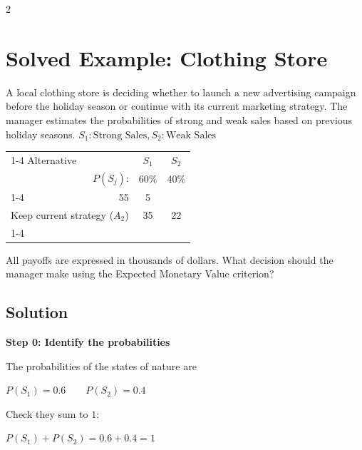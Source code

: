 \begin{multicols}{2}
	
	
	\newpage
	
	\section{Solved Example: Clothing Store}
		
		A local clothing store is deciding whether to launch a new advertising
		campaign before the holiday season or continue with its current
		marketing strategy. The manager estimates the probabilities of strong
		and weak sales based on previous holiday seasons.
		$
		S_1:\text{Strong Sales}
		,
		S_2:\text{Weak Sales}
		$
		\begin{center}
			\renewcommand{\arraystretch}{1.3}
			\small
			\begin{tabular}{lr@{\qquad}cc}
				\cmidrule{1-4}
				Alternative & & $S_1$ & $S_2$ \\
				& $P(S_j)$: & 60\% & 40\% \\
				\cmidrule{1-4}
				\multicolumn{2}{l}{Launch new campaign ($A_1$)} & 55 & 5 \\
				\multicolumn{2}{l}{Keep current strategy ($A_2$)} & 35 & 22 \\
				\cmidrule{1-4}
			\end{tabular}
		\end{center}
		
		All payoffs are expressed in thousands of dollars. What decision should
		the manager make using the Expected Monetary Value criterion?\vspace{-4mm}
		
		\subsection{Solution}
		
		\textbf{Step 0: Identify the probabilities}
		\begin{center}
			\begin{minipage}[c]{0.2\textwidth}
				The probabilities of the states of nature are
			\end{minipage}
			\hfill
			\begin{minipage}[c]{0.28\textwidth}
				\centering
				$P(S_1)=0.6
				\qquad
				P(S_2)=0.4$
			\end{minipage}
		\end{center}
		\begin{center}
			\begin{minipage}[c]{0.2\textwidth}
				Check they sum to $1$:
			\end{minipage}
			\hfill
			\begin{minipage}[c]{0.28\textwidth}
				\centering
				$
				P(S_1)+P(S_2)
				=
				0.6+0.4
				=
				1
				$
			\end{minipage}
		\end{center}\vspace{-3mm}
		

\end{multicols}
